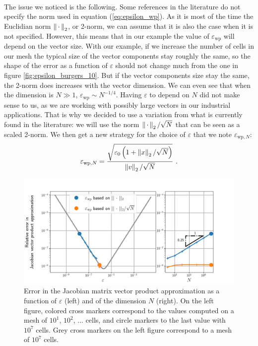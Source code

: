       \paragraph{}
      The issue we noticed is the following.
      Some references in the literature do not specify the norm used in equation (\ref{eq:epsilon_wp}).
      As it is most of the time the Euclidian norm $\norm[2]{\,\cdot\,}$, or 2-norm, we can assume that it is also the case when it is not specified.
      However, this means that in our example the value of $\varepsilon_\textrm{wp}$ will depend on the vector size.
      With our example, if we increase the number of cells in our mesh the typical size of the vector components stay roughly the same, so the shape of the error as a function of $\varepsilon$ should not change much from the one in figure \ref{fig:epsilon_burgers_10}.
      But if the vector components size stay the same, the 2-norm does increases with the vector dimension.
      We can even see that when the dimension is $N \gg 1$, $\varepsilon_\textrm{wp} \sim N^{-1/4}$.
      Having $\varepsilon$ to depend on $N$ did not make sense to us, as we are working with possibly large vectors in our industrial applications.
      That is why we decided to use a variation from what is currently found in the literature: we will use the norm $\norm[2]{\,\cdot\,} / \sqrt{N}$ that can be seen as a scaled 2-norm.
      We then get a new strategy for the choice of $\varepsilon$ that we note $\varepsilon_{\textrm{wp}, N}$:
      \begin{equation}
        \varepsilon_{\textrm{wp}, N} = \frac{\sqrt{\varepsilon_0 \left(1 + \norm[2]{x} / \sqrt{N}\right) }}{\norm[2]{v} / \sqrt{N}} \ .
      \end{equation}

      \begin{figure}
        \centering
        \includegraphics[width=\textwidth]{figures/epsilon_Burgers.png}
        \caption{
          Error in the Jacobian matrix vector product approximation as a function of $\varepsilon$ (left) and of the dimension $N$ (right).
          On the left figure, colored cross markers correspond to the values computed on a mesh of $10^1$, $10^2$, ... cells, and circle markers to the last value with $10^7$ cells.
          Grey cross markers on the left figure correspond to a mesh of $10^7$ cells.
        }
        \label{fig:epsilon_burgers}
      \end{figure}


